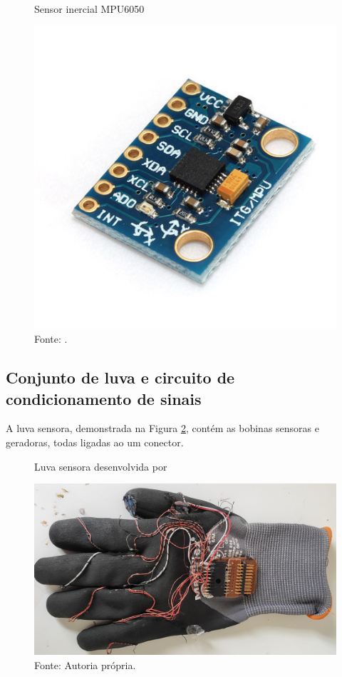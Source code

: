         \begin{figure}[H]
        	\vspace{4mm}
            \centering
            \caption{Sensor inercial MPU6050}
            \label{fig:mpu6050}
            \includegraphics[scale=0.3]{imagens/mpu6050.jpg}
            \caption*{Fonte: .}

        \end{figure}
        
        
        \subsection{Conjunto de luva e circuito de condicionamento de sinais}
        A luva sensora, demonstrada na Figura \ref{fig:luva}, contém as bobinas sensoras e geradoras, todas ligadas ao um conector. 
\begin{figure}[H]
   	\vspace{4mm}
   	\centering
   	\caption{Luva sensora desenvolvida por }
   	\label{fig:luva}
   	\includegraphics[scale=0.10]{imagens/luva_so.jpg}
   	\caption*{Fonte: Autoria própria.}
\end{figure}

